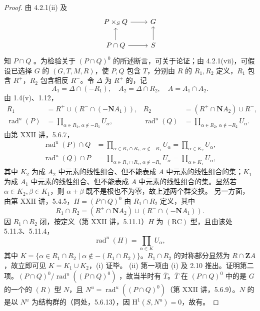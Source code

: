 \begin{proof}
由 4.2.1(ii) 及
\[\begin{tikzcd}P\times_SQ\arrow[r]&G\\P\cap Q\arrow[u]\arrow[r]&S\arrow[u]\end{tikzcd}\]
知 $P\cap Q$ 。为检验关于 $(P\cap Q)^0$ 的所述断言，可关于论证；由 4.2.1(vii)，可假设已选择 $G$ 的 $(G,T,M,R)$，使 $P,Q$ 包含 $T$，分别由 $R$ 的 $R_1,R_2$ 定义，$R_1$ 包含 $R^+$，$R_2$ 包含相反 $R^-$。令 $\Delta$ 为 $R^+$ 的，记
\[A_1=\Delta\cap(-R_1),\quad A_2=\Delta\cap R_2,\quad A=A_1\cap A_2.\]
由 1.4(v)、1.12，
\[\begin{aligned}
R_1&=R^+\cup(R^-\cap(-\mathbf N A_1)),&R_2&=(R^+\cap\mathbf N A_2)\cup R^-,\\
\operatorname{rad}^{u}(P)&=\prod_{\alpha\in R_1,\,\alpha\notin-R_1}U_\alpha,&\operatorname{rad}^{u}(Q)&=\prod_{\alpha\in R_2,\,\alpha\notin-R_2}U_\alpha.
\end{aligned}\]
由第 XXII 讲，5.6.7，
\[\begin{aligned}
\operatorname{rad}^{u}(P)\cap Q&=\prod_{\alpha\in R_1\cap R_2,\,\alpha\notin-R_1}U_\alpha=\prod_{\alpha\in K_2}U_\alpha,\\
\operatorname{rad}^{u}(Q)\cap P&=\prod_{\alpha\in R_1\cap R_2,\,\alpha\notin-R_2}U_\alpha=\prod_{\alpha\in K_1}U_\alpha,
\end{aligned}\]
其中 $K_2$ 为成 $A_2$ 中元素的线性组合、但不能表成 $A$ 中元素的线性组合的集；$K_1$ 为成 $A_1$ 中元素的线性组合、但不能表成 $A$ 中元素的线性组合的集。显然若 $\alpha\in K_2,\beta\in K_1$，则 $\alpha+\beta$ 既不是根也不为零，故上述两个群交换。
另一方面，由第 XXII 讲，5.4.5，$H=(P\cap Q)^0$ 由 $R_1\cap R_2$ 定义，其中
\[R_1\cap R_2=(R^+\cap\mathbf N A_2)\cup(R^-\cap(-\mathbf N A_1)).\]
因 $R_1\cap R_2$ 闭，按定义（第 XXII 讲，5.11.1）$H$ 为 $(\mathrm{RC})$ 型，且由该处 5.11.3、5.11.4，
\[\operatorname{rad}^{u}(H)=\prod_{\alpha\in K}U_\alpha,\]
其中 $K=\{\alpha\in R_1\cap R_2\mid\alpha\notin-(R_1\cap R_2)\}$。$R_1\cap R_2$ 的对称部分显然为 $R\cap\mathbf ZA$，故立即可见 $K=K_1\cup K_2$，(i) 证毕。
(ii) 第一项由 (i) 及 2.10 推出。证明第二项。$(P\cap Q)^0/\operatorname{rad}^{u}((P\cap Q)^0)$ ，故当半时有 $\overline T$。$\overline T$ 在 $(P\cap Q)^0$ 中的是 $G$ 的一个的 $(R)$ 型 $N$，且 $N^u=\operatorname{rad}^{u}((P\cap Q)^0)$（第 XXII 讲，5.6.9）。$N$ 的是以 $N^u$ 为结构群的（同处，5.6.13），因 $\mathrm H^1(S,N^u)=0$，故有。
\end{proof}
